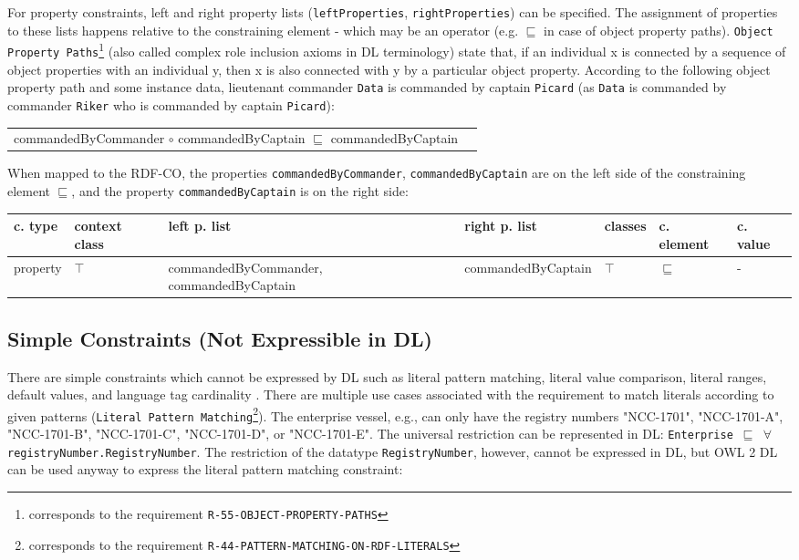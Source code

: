 \documentclass{llncs}
\newcommand{\ms}[1]{\texttt{#1}}
\newenvironment{gcotable}{
  \scriptsize
  \sffamily
  \vspace{0cm}
	\begin{center}
  \begin{tabular}{l|l|l|l|l|l|l}
  \hline
  \textbf{c. type} & \textbf{context class} & \textbf{left p. list} & \textbf{right p. list} & \textbf{classes} & \textbf{c. element} & \textbf{c. value} \\
  \hline

}{
  \hline
  \end{tabular}
	\end{center}
}
\newenvironment{DL}{
  \vspace{0cm}
	\begin{center}
  \begin{tabular}{r l}

}{
  \end{tabular}
	\end{center}
}
\begin{document}
For property constraints, left and right property lists (\ms{leftProperties}, \ms{rightProperties}) can be specified.
The assignment of properties to these lists happens relative to the constraining element - which may be an operator (e.g. $\sqsubseteq$ in case of object property paths).
\ms{Object Property Paths}\footnote{corresponds to the requirement \ms{R-55-OBJECT-PROPERTY-PATHS}} (also called complex role inclusion axioms in DL terminology)
state that, if an individual x is connected by a sequence of object properties with an individual y, 
then x is also connected with y by a particular object property. 
According to the following object property path and some instance data, lieutenant commander \ms{Data} is commanded by captain \ms{Picard} 
(as \ms{Data} is commanded by commander \ms{Riker} who is commanded by captain \ms{Picard}):
\begin{DL}
commandedByCommander $\circ$ commandedByCaptain $\sqsubseteq$ commandedByCaptain 
\end{DL}
When mapped to the RDF-CO, the properties \ms{commandedByCommander}, \ms{commandedByCaptain} are on the left side of the constraining element \ms{$\sqsubseteq$},
and the property \ms{commandedByCaptain} is on the right side:

\begin{gcotable}
property & $\top$ & commandedByCommander, commandedByCaptain & commandedByCaptain & $\top$ & $\sqsubseteq$ & - \\
\end{gcotable}

\subsection{Simple Constraints (Not Expressible in DL)}

There are simple constraints which cannot be expressed by DL such as literal pattern matching, literal value comparison, literal ranges, default values, and language tag cardinality \cite{BoschNolleAcarEckert2015}.
There are multiple use cases associated with the requirement to match literals according to given patterns (\ms{Literal Pattern Matching}\footnote{corresponds to the requirement \ms{R-44-PATTERN-MATCHING-ON-RDF-LITERALS}}).
The enterprise vessel, e.g.,  can only have the registry numbers "NCC-1701", "NCC-1701-A", "NCC-1701-B", "NCC-1701-C", "NCC-1701-D", or "NCC-1701-E".
The universal restriction can be represented in DL:
\ms{Enterprise $\sqsubseteq$ $\forall$ registryNumber.RegistryNumber}.
The restriction of the datatype \ms{RegistryNumber}, however, cannot be expressed in DL, but OWL 2 DL can be used anyway to express the literal pattern matching constraint:
\end{document}
